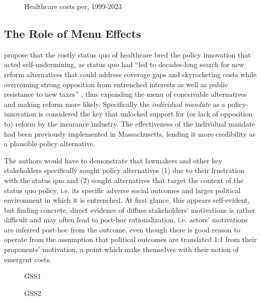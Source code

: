 \documentclass[11pt]{article}
\begin{document}
\begin{figure}[H]
  \sffamily
  \caption{Healthcare costs per, 1999-2023}
  
  \label{fig:costs}
\end{figure}

\subsection*{The Role of Menu Effects}

\textcite[][]{Jacobs2014} propose that the costly status quo of healthcare bred the policy innovation that acted self-undermining, as status quo had \enquote{led to decades-long search for new reform alternatives that could address coverage gaps and skyrocketing costs while overcoming strong opposition from entrenched interests as well as public resistance to new taxes} , thus expanding the menu of conceivable alternatives and making reform more likely. Specifically the \textit{individual mandate} as a policy-innovation is considered the key that unlocked support for (or lack of opposition to) reform by the insurance industry. The effectiveness of the individual mandate had been previously implemented in Massachusetts, lending it more credibility as a plausible policy alternative.

The authors would have to demonstrate that lawmakers and other key stakeholders specifically sought policy alternatives (1) due to their frustration with the status quo and (2) sought alternatives that target the context of the status quo policy, i.e. its specific adverse social outcomes and larger political environment in which it is entrenched. At first glance, this appears self-evident, but finding concrete, direct evidence of diffuse stakeholders' motivations is rather difficult and may often lead to post-hoc rationalization, i.e.  actors' motivations are inferred post-hoc from the outcome, even though there is good reason to operate from the assumption that political outcomes are translated 1:1 from their proponents' motivation, a point which \textcite[][]{Jacobs2014} make themselves with their notion of emergent costs.

\begin{figure}[H]
  \sffamily
  \caption{GSS1}
  
  \label{fig:gss1}
\end{figure}

\begin{figure}[H]
  \sffamily
  \caption{GSS2}
  
  \label{fig:gss2}
\end{figure}
\end{document}
